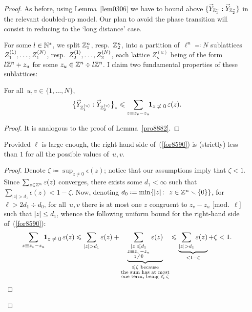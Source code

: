 \begin{proof}
As before, using Lemma~\ref{lem0306}
we have to bound above $\{\vec{Y}_{\ZZ^n_1}:\vec{Y}_{\ZZ^n_2}\}$
in the relevant doubled-up model.
Our plan to avoid the phase transition will consist in reducing to the `long distance' case.

For some $l \in \mathbb{N}^*$,
we split $\mathbb{Z}^n_1$, resp.~$\mathbb{Z}^n_2$,
into a partition of~$\ell^n \eqqcolon N$ sublattices $Z_1^{(1)}, \allowbreak \ldots, \allowbreak Z_1^{(N)}$,
resp.~$Z_2^{(1)}, \allowbreak \ldots, \allowbreak Z_2^{(N)}$,
each lattice $Z_\kappa^{(u)}$ being of the form~$l \mathbb{Z}^n + z_u$ for some $z_u\in\mathbb{Z}^n \div l\mathbb{Z}^n$.
I claim two fundamental properties of these sublattices:

\begin{Clm}\label{clm8133}
For all~$u,v\in\{1,\ldots,N\}$,
\[\label{for8590} \big\{ \vec{Y}_{\ZZ_1^{(u)}} : \vec{Y}_{\ZZ_2^{(v)}} \big\}_*
\leq \sum_{z \equiv z_v-z_u} \!\! \1{z\neq0} \, \epsilon(z) .\]
\end{Clm}

\begin{proof} It is analogous to the proof of Lemma~\ref{pro8882}.
\end{proof}

\begin{Clm}\label{clm9816}
Provided $\ell$ is large enough,
the right-hand side of~(\ref{for8590}) is (strictly) less than $1$
for all the possible values of~$u,v$.
\end{Clm}

\begin{proof}
Denote $\zeta \coloneqq \sup_{z\neq0} \epsilon(z)$;
notice that our assumptions imply that $\zeta < 1$.
Since $\sum_{z\in\mathbb{Z}^n} \varepsilon(z)$ converges,
there exists some $d_1<\infty$ such that $\sum_{|z|>d_1} \epsilon(z) < 1-\zeta$.
Now, denoting $d_0 \coloneqq \min\{ |z| \colon z\in\ZZ^n\setminus\{0\} \}$,
for $\ell > 2d_1 \div d_0$, for all~$u,v$ there is at most one $z$ congruent to
$z_v-z_u$ [mod.\ $\ell$] such that $|z| \leq d_1$,
whence the following uniform bound for the right-hand side of~(\ref{for8590}):
%
\[ \sum_{z\equiv z_v-z_u} \!\! \1{z\neq0} \, \epsilon(z)
\leq \sum_{|z| > d_1} \epsilon(z)
+ \underbrace{\sum_{\substack{|z|\leq d_1\\z\equiv z_v-z_u\\z\neq 0}} \epsilon(z)}%
_{\substack{\leq \zeta \text{ because}\\\text{the sum has at most}\\\text{one term, being $\leq \zeta$}}}
\leq \underbrace{\sum_{|z| > d_1} \epsilon(z)}_{< 1-\zeta} + \zeta < 1.\]
\end{proof}


\end{proof}
